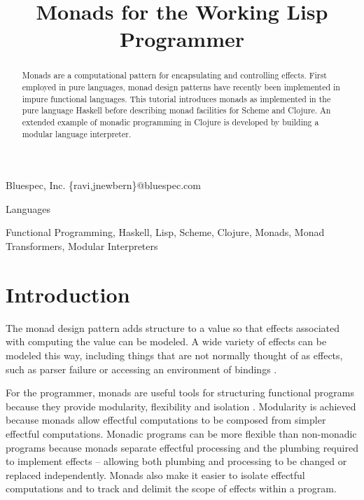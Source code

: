 \documentclass[natbib,10pt]{sigplanconf}
\begin{document}
\copyrightdata{[to be supplied]}
\toappear{}


\title{Monads for the Working Lisp Programmer}

           {Bluespec, Inc.}
           {\{ravi,jnewbern\}@bluespec.com}

\maketitle

\begin{abstract}

Monads are a computational pattern for encapsulating and controlling
effects.  First employed in pure languages, monad design patterns have
recently been implemented in impure functional languages.  This
tutorial introduces monads as implemented in the pure language Haskell
before describing monad facilities for Scheme and Clojure.  An extended
example of monadic programming in Clojure is developed by building a
modular language interpreter.

\end{abstract}


\terms
Languages

\keywords
Functional Programming, Haskell, Lisp, Scheme, Clojure, Monads, Monad Transformers, Modular Interpreters

\section{Introduction}

The monad design pattern adds structure to a value so that effects
associated with computing the value can be modeled.  A wide variety of
effects can be modeled this way, including things that are not
normally thought of as effects, such as parser failure or accessing an
environment of bindings
\citep{moggi-monads, wadlermonads, parser-combinators}.

For the programmer, monads are useful tools for structuring functional
programs because they provide modularity, flexibility and isolation
\citep{all-about-monads, pureshirt}.
Modularity is achieved because monads allow effectful computations to
be composed from simpler effectful computations. Monadic programs can be
more flexible than non-monadic programs because monads separate
effectful processing and the plumbing required to implement effects --
allowing both plumbing and processing to be changed or replaced
independently. Monads also make it easier to isolate effectful
computations and to track and delimit the scope of effects within a
program.
\end{document}
